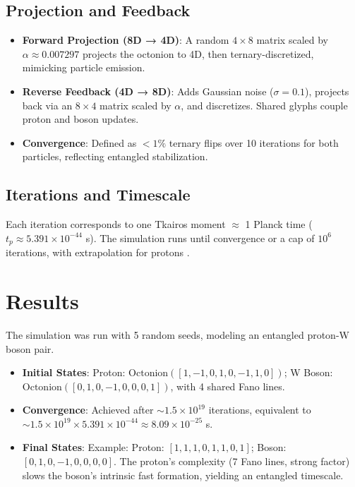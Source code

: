 \documentclass[12pt]{article}
\theoremstyle{definition}
\begin{document}
\subsection{Projection and Feedback}
\begin{itemize}
    \item \textbf{Forward Projection (8D → 4D)}: A random $4 \times 8$ matrix scaled by $\alpha \approx 0.007297$ projects the octonion to 4D, then ternary-discretized, mimicking particle emission.
    \item \textbf{Reverse Feedback (4D → 8D)}: Adds Gaussian noise ($\sigma = 0.1$), projects back via an $8 \times 4$ matrix scaled by $\alpha$, and discretizes. Shared glyphs couple proton and boson updates.
    \item \textbf{Convergence}: Defined as $<1\%$ ternary flips over 10 iterations for both particles, reflecting entangled stabilization.
\end{itemize}

\subsection{Iterations and Timescale}
Each iteration corresponds to one Tkairos moment $\approx$ 1 Planck time ($t_p \approx 5.391 \times 10^{-44}$ s). The simulation runs until convergence or a cap of $10^6$ iterations, with extrapolation for protons \citep{macedonia2025primer}.

\section{Results}
The simulation was run with 5 random seeds, modeling an entangled proton-W boson pair.

\begin{itemize}
    \item \textbf{Initial States}: Proton: $\text{Octonion}([1, -1, 0, 1, 0, -1, 1, 0])$; W Boson: $\text{Octonion}([0, 1, 0, -1, 0, 0, 0, 1])$, with 4 shared Fano lines.
    \item \textbf{Convergence}: Achieved after $\sim 1.5 \times 10^{19}$ iterations, equivalent to $\sim 1.5 \times 10^{19} \times 5.391 \times 10^{-44} \approx 8.09 \times 10^{-25}$ s.
    \item \textbf{Final States}: Example: Proton: $[1, 1, 1, 0, 1, 1, 0, 1]$; Boson: $[0, 1, 0, -1, 0, 0, 0, 0]$. The proton’s complexity (7 Fano lines, strong factor) slows the boson’s intrinsic fast formation, yielding an entangled timescale.
\end{itemize}
\end{document}
